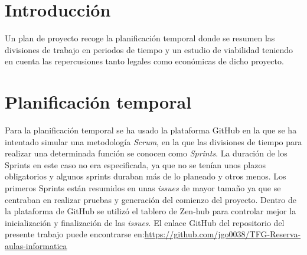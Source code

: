 
\section{Introducción}
Un plan de proyecto recoge la planificación temporal donde se resumen las divisiones de trabajo en periodos de tiempo y un estudio de viabilidad teniendo en cuenta las repercusiones tanto legales como económicas de dicho proyecto.

\section{Planificación temporal}
Para la planificación temporal se ha usado la plataforma GitHub en la que se ha intentado simular una metodología \textit{Scrum}, en la que las divisiones de tiempo para realizar una determinada función se conocen como \textit{Sprints}. La duración de los Sprints en este caso no era especificada, ya que no se tenían unos plazos obligatorios y algunos sprints duraban más de lo planeado y otros menos. Los primeros Sprints están resumidos en unas \textit{issues} de mayor tamaño ya que se centraban en realizar pruebas y generación del comienzo del proyecto.\newline
Dentro de la plataforma de GitHub se utilizó el tablero de Zen-hub para controlar mejor la inicialización y finalización de las \textit{issues}.\newline
El enlace GitHub del repositorio del presente trabajo puede encontrarse en:\newline \url{https://github.com/jgo0038/TFG-Reserva-aulas-informatica} \newline

